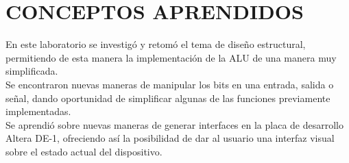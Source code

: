 \documentclass[12pt, letterpaper]{IEEEtran}
\begin{document}
\section{CONCEPTOS APRENDIDOS}
\indent En este laboratorio se investigó y retomó el tema de diseño estructural, permitiendo de esta manera la implementación de la ALU de una manera muy simplificada.\\
\indent Se encontraron nuevas maneras de manipular los bits en una entrada, salida o señal, dando oportunidad de simplificar algunas de las funciones previamente implementadas.\\
\indent Se aprendió sobre nuevas maneras de generar interfaces en la placa de desarrollo Altera DE-1, ofreciendo así la posibilidad de dar al usuario una interfaz visual sobre el estado actual del dispositivo.\\
\end{document}
